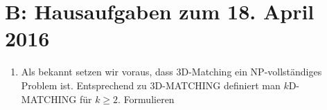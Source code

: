 \documentclass[12pt,a4paper]{scrreprt}
\begin{document}
\section*{B: Hausaufgaben zum 18. April 2016}

\begin{enumerate}
	\item Als bekannt setzen wir voraus, dass 3D-Matching ein NP-vollständiges Problem ist. Entsprechend zu 3D-MATCHING definiert man $k$D-MATCHING für $k \geq 2$. Formulieren
\end{enumerate}

%
%
%
%
%
\end{document}
